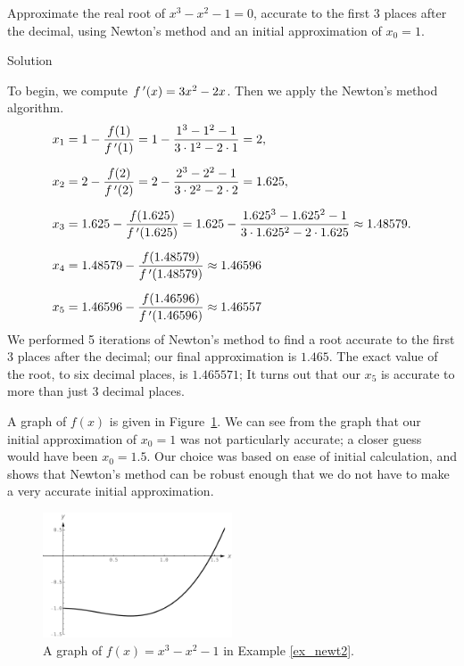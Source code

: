 \begin{example}\label{ex_newt2}
Approximate the real root of $x^3-x^2-1=0$,  accurate to the first 3 places after the decimal, using Newton's method and an initial approximation of $x_0=1$.

\ifanalysis\pagebreak\fi
{}Solution 

To begin, we compute $f\,'(x)=3x^2-2x$.  Then we apply the Newton's method algorithm. 
\ifcalculus\allowdisplaybreaks\fi
\begin{align*}
x_1&=1-\frac{f(1)}{f\,'(1)}=1-\frac{1^3-1^2-1}{3\cdot 1^2-2\cdot 1}=2,\\[0.2cm]
x_2&=2-\frac{f(2)}{f\,'(2)}=2-\frac{2^3-2^2-1}{3\cdot 2^2-2\cdot 2}=1.625,\\[0.2cm]
x_3&=1.625-\frac{f(1.625)}{f\,'(1.625)} = 1.625-\frac{1.625^3-1.625^2-1}{3\cdot 1.625^2-2\cdot 1.625}\approx 1.48579. \\[0.2cm]
x_4 &= 1.48579 - \frac{f(1.48579)}{f\,'(1.48579)} \approx  1.46596\\[0.2cm]
x_5 &= 1.46596 - \frac{f(1.46596)}{f\,'(1.46596)} \approx 1.46557
\end{align*}
We performed 5 iterations of Newton's method to find a root accurate to the first 3 places after the decimal; our final approximation is $1.465.$ The exact value of the root, to six decimal places, is $1.465571$;  It turns out that our $x_5$ is accurate to more than just 3 decimal places.

A graph of $f(x)$ is given in Figure~\ref{fig_diff_13}. We can see from the graph that our initial approximation of $x_0=1$ was not particularly accurate; a closer guess would have been $x_0=1.5$. Our choice was based on ease of initial calculation, and shows that Newton's method can be robust enough that we do not have to make a very accurate initial approximation.


\begin{figure}[H]
	\begin{center}
			\includegraphics[width=0.5\textwidth]{fig_diff_13}
	\caption{A graph of $f(x) = x^3-x^2-1$ in Example \ref{ex_newt2}.}
	\label{fig_diff_13}
	\end{center}
\end{figure}

\end{example}



